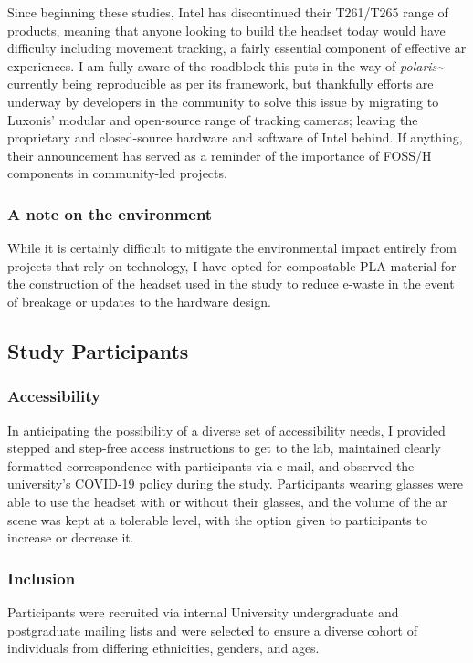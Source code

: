 Since beginning these studies, Intel has discontinued their T261/T265 range of products, meaning that anyone looking to build the headset today would have difficulty including movement tracking, a fairly essential component of effective \gls{ar} experiences. I am fully aware of the roadblock this puts in the way of \textit{polaris\textasciitilde{}} currently being reproducible as per its framework, but thankfully efforts are underway by developers in the community to solve this issue by migrating to Luxonis' modular and open-source range of tracking cameras; leaving the proprietary and closed-source hardware and software of Intel behind. If anything, their announcement has served as a reminder of the importance of FOSS/H components in community-led projects.

\subsubsection{A note on the environment}\label{sec: polaris-ethics-environment}
While it is certainly difficult to mitigate the environmental impact entirely from projects that rely on technology, I have opted for compostable PLA material for the construction of the headset used in the study to reduce e-waste in the event of breakage or updates to the hardware design.

\subsection{Study Participants}\label{sec: polaris-ethics-participants}
\subsubsection{Accessibility}\label{sec: polaris-ethics-accessibility}
In anticipating the possibility of a diverse set of accessibility needs, I provided stepped and step-free access instructions to get to the lab, maintained clearly formatted correspondence with participants via e-mail, and observed the university's COVID-19 policy during the study. Participants wearing glasses were able to use the headset with or without their glasses, and the volume of the \gls{ar} scene was kept at a tolerable level, with the option given to participants to increase or decrease it.

\subsubsection{Inclusion}\label{sec: polaris-ethics-inclusion}
Participants were recruited via internal University undergraduate and postgraduate mailing lists and were selected to ensure a diverse cohort of individuals from differing ethnicities, genders, and ages.

